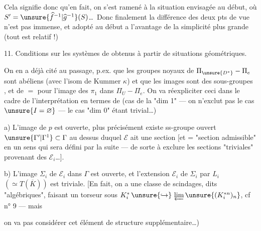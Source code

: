 
Cela signifie donc qu'en fait, on s'est ramené à la situation envisagée au début,
où \(S'=\unsure{\widehat f^{-1}|\widehat g^{-1}}(S)\)\ldots\ Donc finalement
la différence des deux pts de vue n'est pas immense, et
 adopté au début a l'avantage de
la simplicité plus grande (tout est relatif !)


11. Conditions sur les systèmes de 
 obtenus à partir de situations géométriques.

On en a déjà cité au passage, p.ex. que les groupes noyaux de
\(\Pi_{\unsure{D^*}}-\Pi_e\) sont abéliens (avec l'isom de Kummer \(\kappa\))
et que les images sont des sous-groupes , et de \(=\) pour
l'image des  \(\pi_1\) dans \(\Pi_U-\Pi_e\).
On va réexpliciter  ceci dans le cadre de l'interprétation
en termes de
(cas de la "dim 1" --- on n'exclut pas le cas \(\unsure{I=\varnothing}\) ---
le cas "dim 0" étant trivial\ldots)

a) L'image \inserted{\(\Sigma\)} de \(p\) est ouverte, plus précisément existe
ss-groupe ouvert \(\unsure{\Gamma'|\Gamma^1}\subset\Gamma\) au dessus duquel
\(\mathcal E\) ait une section [et = "section admissible" en un sens qui sera
défini par la suite --- de sorte à exclure les sections "triviales" provenant
des \(\mathcal E_i\)\ldots].

b) L'image \(\Sigma_i\) de \(\mathcal E_i\) dans \(\Gamma\) est ouverte, et
l'extension \(\mathcal E_i\) de \(\Sigma_i\) par \(L_i\)
\((\simeq T(\overline K))\) est triviale. [En fait, on a une classe
 de scindages, dits "algébriques", faisant un
torseur sous
\(K_i^*\,\unsure{\hookrightarrow}\,\varprojlim\unsure{(K_i^{*n})_n}\),
cf n° 9  --- mais


on va pas considérer  cet élément de structure
supplémentaire\ldots)


